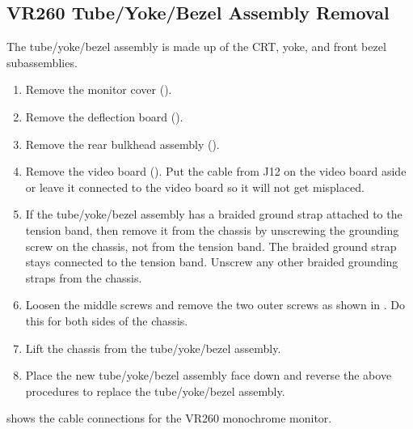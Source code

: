 \subsection{VR260 Tube/Yoke/Bezel Assembly Removal}

The tube/yoke/bezel assembly is made up of the CRT, yoke, and front bezel
subassemblies.

\begin{enumerate}

\item	Remove the monitor cover ().

\item	Remove the deflection board ().

\item	Remove the rear bulkhead assembly ().

\item	Remove the video board (). Put the cable from J12 on
		the video board aside or leave it connected to the video board so it will
		not get misplaced.

\item	If the tube/yoke/bezel assembly has a braided ground strap attached to
		the tension band, then remove it from the chassis by unscrewing the
		grounding screw on the chassis, not from the tension band. The braided
		ground strap stays connected to the tension band. Unscrew any other
		braided grounding straps from the chassis.

\item	Loosen the middle screws and remove the two outer screws as shown
		in . Do this for both sides of the chassis.

\newpage

\item	Lift the chassis from the tube/yoke/bezel assembly.

\item	Place the new tube/yoke/bezel assembly face down and reverse the
		above procedures to replace the tube/yoke/bezel assembly.


\end{enumerate}
 shows the cable connections for the VR260 monochrome monitor.

